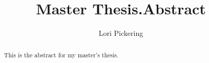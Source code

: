 \documentclass[../../main/main.tex]{subfiles}
\begin{document}
\title{Master Thesis.Abstract}
\author{Lori Pickering}
\begin{abstract}
This is the abstract for my master's thesis.
\end{abstract}
\end{document}
